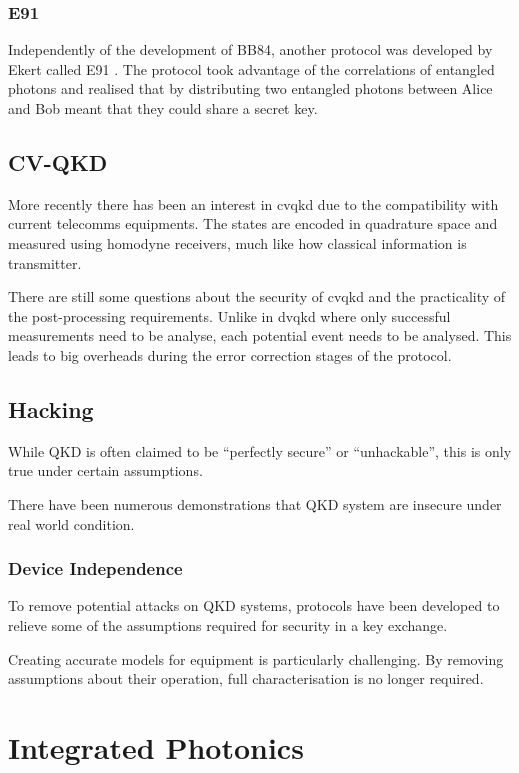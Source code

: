 \subsubsection*{E91}

Independently of the development of BB84, another protocol was developed by Ekert called E91 \cite{E91}. The protocol took advantage of the correlations of entangled photons and realised that by distributing two entangled photons between Alice and Bob meant that they could share a secret key. 

\subsection{CV-QKD}

More recently there has been an interest in \ac{cvqkd} due to the compatibility with current telecomms equipments. The states are encoded in quadrature space and measured using homodyne receivers, much like how classical information is transmitter.

There are still some questions about the security of \ac{cvqkd} and the practicality of the post-processing requirements. Unlike in \ac{dvqkd} where only successful measurements need to be analyse, each potential event needs to be analysed. This leads to big overheads during the error correction stages of the protocol.

\subsection{Hacking}

While \ac{QKD} is often claimed to be ``perfectly secure'' or ``unhackable'', this is only true under certain assumptions. 

There have been numerous demonstrations that \ac{QKD} system are insecure under real world condition.

\subsubsection*{Device Independence}

To remove potential attacks on \ac{QKD} systems, protocols have been developed to relieve some of the assumptions required for security in a key exchange. 

Creating accurate models for equipment is particularly challenging. By removing assumptions about their operation, full characterisation is no longer required.

\section{Integrated Photonics}

